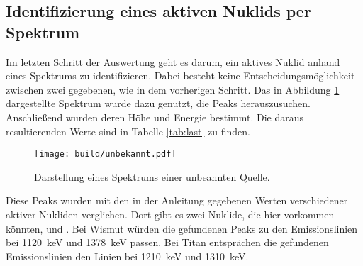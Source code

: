 \subsection{Identifizierung eines aktiven Nuklids per Spektrum}
\label{sec:Nuklidbestimmung}
Im letzten Schritt der Auswertung geht es darum, ein aktives Nuklid anhand eines
Spektrums zu identifizieren. Dabei besteht keine Entscheidungsmöglichkeit zwischen
zwei gegebenen, wie in dem vorherigen Schritt.
Das in Abbildung \ref{plt:unbekannt} dargestellte Spektrum wurde dazu genutzt, die Peaks herauszusuchen.
Anschließend wurden deren Höhe und Energie bestimmt. Die daraus
resultierenden Werte sind in Tabelle \ref{tab:last} zu finden.
\begin{figure}[htb]
  \centering
  \texttt{[image: build/unbekannt.pdf]}
  \caption{Darstellung eines Spektrums einer unbeannten Quelle.}
  \label{plt:unbekannt}
\end{figure}

\FloatBarrier
Diese Peaks wurden mit den in der Anleitung \cite{anleitung} gegebenen Werten
verschiedener aktiver Nukliden verglichen.
Dort gibt es zwei Nuklide, die hier vorkommen könnten,  und
. Bei Wismut würden die gefundenen Peaks zu den Emissionslinien
bei \SI{1120}{\kilo\electronvolt} und \SI{1378}{\kilo\electronvolt} passen. Bei Titan
entsprächen die gefundenen Emissionslinien den Linien bei \SI{1210}{\kilo\electronvolt}
und \SI{1310}{\kilo\electronvolt}.
